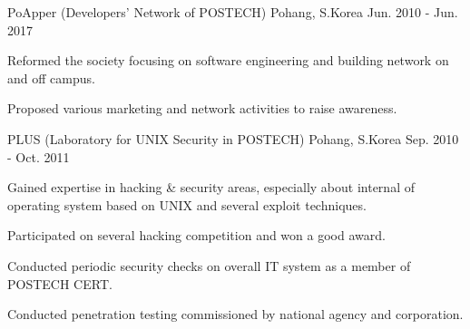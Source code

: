 

\begin{cventries}

	{PoApper (Developers' Network of POSTECH)} %
	{Pohang, S.Korea} %
	{Jun. 2010 - Jun. 2017} %
	{
		\begin{cvitems} %
			\item {Reformed the society focusing on software engineering and building network on and off campus.}
			\item {Proposed various marketing and network activities to raise awareness.}
		\end{cvitems}
	}

	{PLUS (Laboratory for UNIX Security in POSTECH)} %
	{Pohang, S.Korea} %
	{Sep. 2010 - Oct. 2011} %
	{
		\begin{cvitems} %
			\item {Gained expertise in hacking \& security areas, especially about internal of operating system based on UNIX and several exploit techniques.}
			\item {Participated on several hacking competition and won a good award.}
			\item {Conducted periodic security checks on overall IT system as a member of POSTECH CERT.}
			\item {Conducted penetration testing commissioned by national agency and corporation.}
		\end{cvitems}
	}

\end{cventries}
